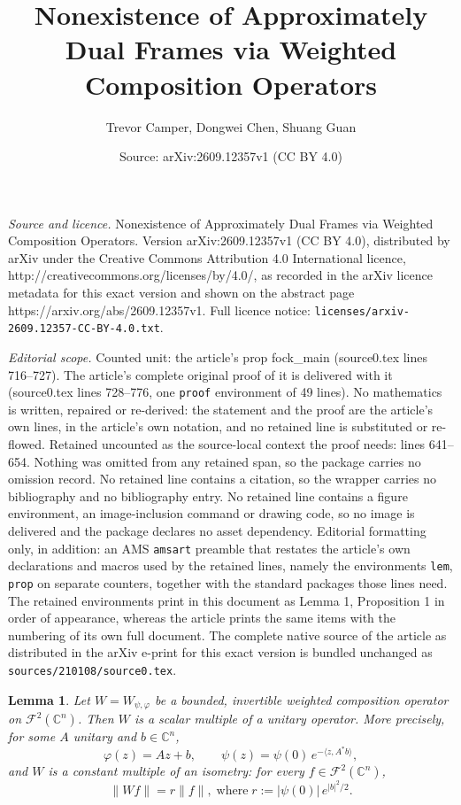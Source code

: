 \documentclass[10pt,a4paper]{amsart}
\title{Nonexistence of Approximately Dual Frames via Weighted Composition Operators}
\author{Trevor Camper, Dongwei Chen, Shuang Guan}
\date{Source: arXiv:2609.12357v1 (CC BY 4.0)}
\newtheorem{lem}{Lemma}
\begin{document}
\maketitle

\noindent\emph{Source and licence.} Nonexistence of Approximately Dual Frames via Weighted Composition Operators. Version arXiv:2609.12357v1 (CC BY 4.0), distributed by arXiv under the Creative Commons Attribution 4.0 International licence, http://creativecommons.org/licenses/by/4.0/, as recorded in the arXiv licence metadata for this exact version and shown on the abstract page https://arxiv.org/abs/2609.12357v1. Full licence notice: \texttt{licenses/arxiv-2609.12357-CC-BY-4.0.txt}.\par\smallskip

\noindent\textit{Editorial scope.} Counted unit: the article's prop fock\_main (source0.tex lines 716--727). The article's complete original proof of it is delivered with it (source0.tex lines 728--776, one \texttt{proof} environment of 49 lines). No mathematics is written, repaired or re-derived: the statement and the proof are the article's own lines, in the article's own notation, and no retained line is substituted or re-flowed.  Retained uncounted as the source-local context the proof needs: lines 641--654.  Nothing was omitted from any retained span, so the package carries no omission record.  No retained line contains a citation, so the wrapper carries no bibliography and no bibliography entry.  No retained line contains a figure environment, an image-inclusion command or drawing code, so no image is delivered and the package declares no asset dependency.  Editorial formatting only, in addition: an AMS \texttt{amsart} preamble that restates the article's own declarations and macros used by the retained lines, namely the environments \texttt{lem}, \texttt{prop} on separate counters, together with the standard packages those lines need.  The retained environments print in this document as Lemma 1, Proposition 1 in order of appearance, whereas the article prints the same items with the numbering of its own full document.  The complete native source of the article as distributed in the arXiv e-print for this exact version is bundled unchanged as \texttt{sources/210108/source0.tex}.
\begin{lem}\label{wco_fock_lem}
    Let $W = W_{\psi,\varphi}$ be a bounded, invertible weighted
composition operator on $\mathcal{F}^2(\mathbb{C}^n)$. Then $W$ is a scalar
multiple of a unitary operator. More precisely, for some $A$ unitary and $b \in \mathbb{C}^n$,
\[
\varphi(z) = Az + b, \qquad
\psi(z) = \psi(0)\, e^{-\langle z, A^*b\rangle},
\]
and $W$ is a constant multiple of an isometry: for every
$f \in \mathcal{F}^2(\mathbb{C}^n)$,
\[
\|Wf\| = r\|f\|,\; \text{where} \; r := |\psi(0)|\, e^{|b|^2/2}.
\]
\end{lem}
\end{document}
